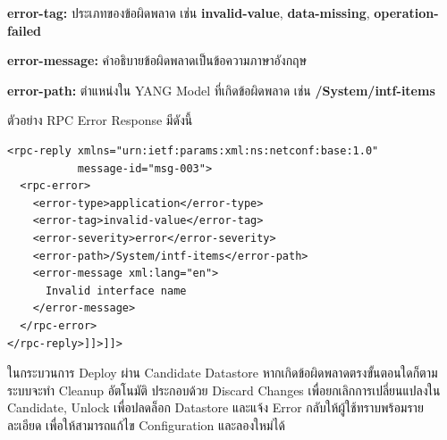 \begin{mycustomenum2}
    \item \textbf{error-tag:} ประเภทของข้อผิดพลาด เช่น \textbf{invalid-value}, \textbf{data-missing}, \textbf{operation-failed}
    \item \textbf{error-message:} คำอธิบายข้อผิดพลาดเป็นข้อความภาษาอังกฤษ
    \item \textbf{error-path:} ตำแหน่งใน YANG Model ที่เกิดข้อผิดพลาด เช่น \textbf{/System/intf-items}
\end{mycustomenum2}

\hspace*{1.3em}
ตัวอย่าง RPC Error Response มีดังนี้

\begin{verbatim}
<rpc-reply xmlns="urn:ietf:params:xml:ns:netconf:base:1.0"
           message-id="msg-003">
  <rpc-error>
    <error-type>application</error-type>
    <error-tag>invalid-value</error-tag>
    <error-severity>error</error-severity>
    <error-path>/System/intf-items</error-path>
    <error-message xml:lang="en">
      Invalid interface name
    </error-message>
  </rpc-error>
</rpc-reply>]]>]]>
\end{verbatim}

\hspace*{1.3em}
ในกระบวนการ Deploy ผ่าน Candidate Datastore หากเกิดข้อผิดพลาดตรงขั้นตอนใดก็ตาม ระบบจะทำ Cleanup อัตโนมัติ ประกอบด้วย Discard Changes เพื่อยกเลิกการเปลี่ยนแปลงใน Candidate, Unlock เพื่อปลดล็อก Datastore และแจ้ง Error กลับให้ผู้ใช้ทราบพร้อมรายละเอียด เพื่อให้สามารถแก้ไข Configuration และลองใหม่ได้


